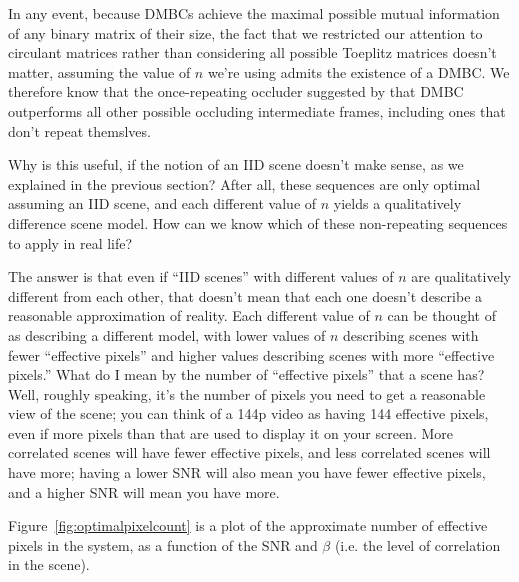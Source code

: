 In any event, because DMBCs achieve the maximal possible mutual information of any binary matrix of their size, the fact that we restricted our attention to circulant matrices rather than considering all possible Toeplitz matrices doesn't matter, assuming the value of $n$ we're using admits the existence of a DMBC. We therefore know that the once-repeating occluder suggested by that DMBC outperforms all other possible occluding intermediate frames, including ones that don't repeat themslves.

Why is this useful, if the notion of an IID scene doesn't make sense, as we explained in the previous section? After all, these sequences are only optimal assuming an IID scene, and each different value of $n$ yields a qualitatively difference scene model. How can we know which of these non-repeating sequences to apply in real life?

The answer is that even if ``IID scenes'' with different values of $n$ are qualitatively different from each other, that doesn't mean that each one doesn't describe a reasonable approximation of reality. Each different value of $n$ can be thought of as describing a different model, with lower values of $n$ describing scenes with fewer ``effective pixels'' and higher values describing scenes with more ``effective pixels.'' What do I mean by the number of ``effective pixels'' that a scene has? Well, roughly speaking, it's the number of pixels you need to get a reasonable view of the scene; you can think of a 144p video as having 144 effective pixels, even if more pixels than that are used to display it on your screen. More correlated scenes will have fewer effective pixels, and less correlated scenes will have more; having a lower SNR will also mean you have fewer effective pixels, and a higher SNR will mean you have more.

Figure~\ref{fig:optimalpixelcount} is a plot of the approximate number of effective pixels in the system, as a function of the SNR and $\beta$ (i.e. the level of correlation in the scene).

